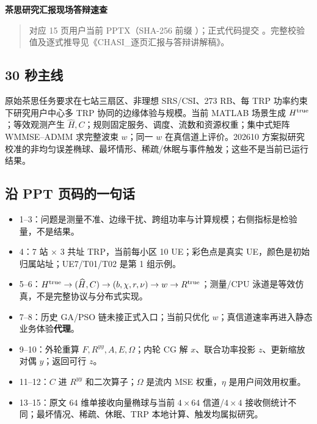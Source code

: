 \documentclass[11pt,a4paper]{ctexart}
\begin{document}
\begin{center}\LARGE\bfseries 茶思研究汇报现场答辩速查\end{center}

\begin{quote}\small 对应 15 页用户当前 PPTX（SHA-256 前缀 ）；正式代码提交 。完整校验值及逐式推导见《CHASI\_逐页汇报与答辩讲解稿》。\end{quote}

\subsection*{30 秒主线}

原始茶思任务要求在七站三扇区、非理想 SRS/CSI、273 RB、每 TRP 功率约束下研究用户中心多 TRP 协同的边缘体验与规模。当前 MATLAB 场景生成 $H^{\rm true}$；等效观测产生 $\widehat H,C$；规则固定服务、调度、流数和资源权重；集中式矩阵 WMMSE–ADMM 求完整波束 $w$；同一 $w$ 在真信道上评价。202610 方案拟研究校准的非均匀误差椭球、最坏情形、稀疏/休眠与事件触发；这些不是当前已运行结果。\par

\subsection*{沿 PPT 页码的一句话}

\begin{itemize}[leftmargin=2em,itemsep=1pt]
\item 1–3：问题是测量不准、边缘干扰、跨组功率与计算规模；右侧指标是检验量，不是结果。
\item 4：7 站 × 3 共址 TRP，当前每小区 10 UE；彩色点是真实 UE，颜色是初始归属站址；UE7/T01/T02 是第 1 组示例。
\item 5–6：$H^{\rm true}\to(\widehat H,C)\to(b,\chi,r,\nu)\to w\to R^{\rm true}$；测量/CPU 泳道是等效仿真，不是完整协议与分布式实现。
\item 7–8：历史 GA/PSO 链未接正式入口；当前只优化 $w$；真信道速率再进入静态业务体验\textbf{代理}。
\item 9–10：外轮重算 $F,R^{yy},A,E,\Omega$；内轮 CG 解 $x$、联合功率投影 $z$、更新缩放对偶 $y$；返回可行 $z$。
\item 11–12：$C$ 进 $R^{yy}$ 和二次算子；$\Omega$ 是流内 MSE 权重，$\eta$ 是用户间效用权重。
\item 13–15：原文 $64$ 维单接收向量椭球与当前 $4\times64$ 信道/$4\times4$ 接收侧统计不同；最坏情况、稀疏、休眠、TRP 本地计算、触发均属拟研究。
\end{itemize}
\end{document}
